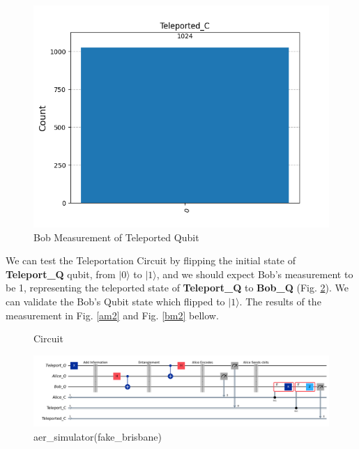 \begin{figure}[h!]
    \centering
    \caption{Bob Measurement of Teleported Qubit}
    \label{bm}    
    \begin{minipage}{0.49\textwidth}
        \centering
        \includegraphics[width=\linewidth]{exercise3/94df8a48-88cc-4ec6-8341-d8ae773c7c37__Teleported_C__counts.png}
    \end{minipage}
\end{figure}

\vspace{6cm} %

We can test the Teleportation Circuit by flipping the initial state of \textbf{Teleport\_Q} qubit, from $|0\rangle$ to $|1\rangle$, and we should expect Bob's measurement to be 1, representing the teleported state of \textbf{Teleport\_Q} to \textbf{Bob\_Q} (Fig. \ref{ctt}). We can validate the Bob's Qubit state which flipped to $|1\rangle$. The results of the measurement in Fig. \ref{am2} and Fig. \ref{bm2} bellow.

\begin{figure}[h!]
    \centering
    \caption{Circuit}
    \label{ctt}
    \begin{minipage}{1\textwidth}
        \centering
        \includegraphics[width=\linewidth]{exercise3/test/aer_simulator__circuit.png}
        \caption*{aer\_simulator(fake\_brisbane)}
    \end{minipage}
\end{figure}



